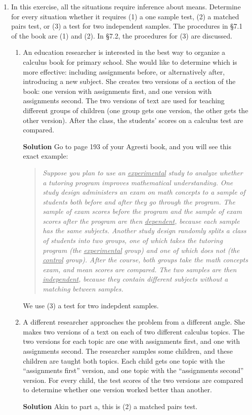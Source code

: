 \begin{enumerate}
    \item In this exercise, all the situations require inference about means. Determine for every situation whether it requires (1) a one sample test, (2) a matched pairs test, or (3) a test for two independent samples. The procedures in \S7.1 of the book are (1) and (2). In \S7.2, the procedures for (3) are discussed.
    \begin{enumerate}
        \item An education researcher is interested in the best way to organize a calculus book for primary school. She would like to determine which is more effective: including assignments before, or alternatively after, introducing a new subject. She creates two versions of a section of the book: one version with assignments first, and one version with assignments second. The two versions of text are used for teaching different groups of children (one group gets one version, the other gets the other version). After the class, the students' scores on a calculus test are compared.
        \begin{framed}{\textbf{Solution}}
        Go to page 193 of your Agresti book, and you will see this exact example:
        \begin{quote}
            \textit{Suppose you plan to use an \underline{experimental} study to analyze whether a tutoring program improves mathematical understanding. One study design administers an exam on math concepts to a sample of students both before and after they go through the program. The sample of exam scores before the program and the sample of exam scores after the program are then \underline{dependent}, because each sample has the same subjects. Another study design randomly splits a class of students into two groups, one of which takes the tutoring program (the \underline{experimental} group) and one of which does not (the \underline{control} group). After the course, both groups take the math concepts exam, and mean scores are compared. The two samples are then \underline{independent}, because they contain different subjects without a matching between samples.}
        \end{quote}
        We use (3) a test for two indepdent samples.
        \end{framed}
        
        \item A different researcher approaches the problem from a different angle. She makes two versions of a text on each of two different calculus topics. The two versions for each topic are one with assignments first, and one with assignments second. The researcher samples some children, and these children are taught both topics. Each child gets one topic with the ``assignments first'' version, and one topic with the ``assignments second'' version. For every child, the test scores of the two versions are compared to determine whether one version worked better than another.
        \begin{framed}{\textbf{Solution}}
        Akin to part a, this is (2) a matched pairs test.
        \end{framed}
        

\end{enumerate}
\end{enumerate}
